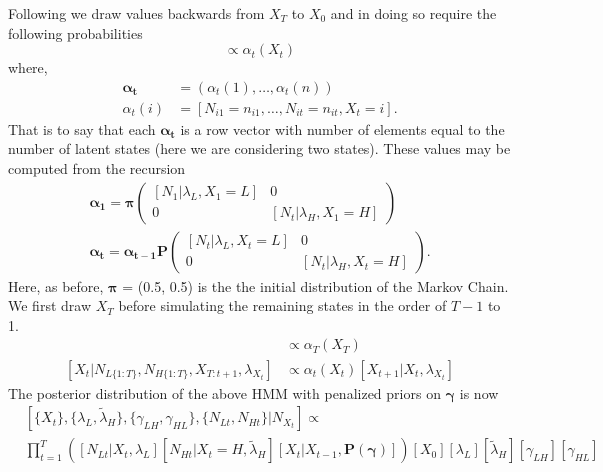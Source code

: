\documentclass[cmbright,fleqn,referee]{envauth}
\begin{document}
Following \cite{Zucchini2009a} we draw values backwards from $X_T$ to $X_0$ and in doing so require the following probabilities
\begin{equation}
[X_t | N_{L\{1:t\}}, N_{H\{1:t\}}, \lambda_{X_t}] \propto \alpha_t(X_t)
\label{e:startFB}
\end{equation}
where, 
\begin{align}
\bm{\alpha_t} &= (\alpha_t(1), \dots, \alpha_t(n))\\
\alpha_t(i) &= [N_{i1} = n_{i1}, \dots, N_{it} = n_{it}, X_t = i].
\end{align}
That is to say that each $\bm{\alpha_t}$ is a row vector with number of elements equal to the number of latent states (here we are considering two states).  These values may be computed from the recursion
\begin{align}
\bm{\alpha_1} = \bm{\pi} \begin{pmatrix}
[N_1|\lambda_{L}, X_1 = L] & 0\\
0 & [N_t | \lambda_{H}, X_1 = H]
\end{pmatrix}  \\
\bm{\alpha_t = \alpha_{t - 1}}\mathbf{P}\begin{pmatrix}
[N_t|\lambda_{L}, X_t = L] & 0\\
0 & [N_t | \lambda_{H}, X_t = H]
\end{pmatrix} .
\end{align}
Here, as before, $\bm{\pi}$ = (0.5, 0.5) is the the initial distribution of the Markov Chain. We first draw $X_T$ before simulating the remaining states in the order of $T - 1$ to 1. 
\begin{align}
[X_T | N_{L\{1:T\}}, N_{H\{1:T\}}, \lambda_{X_T}] &\propto \alpha_T(X_T)\\
[X_t | N_{L\{1:T\}}, N_{H\{1:T\}}, X_{T:t+1}, \lambda_{X_t}] &\propto \alpha_t(X_t) [X_{t+1} | X_t, \lambda_{X_t}]
\label{e:endFB}
\end{align}
The posterior distribution of the above HMM with penalized priors on $\bm{\gamma}$ is now
\begin{equation}
\begin{aligned}
 &[\{X_t\}, \{\lambda_L, \tilde{\lambda}_H\}, \{\gamma_{LH}, \gamma_{HL}\}, \{N_{Lt}, N_{Ht}\} | N_{X_t} ] \propto \\
 &\prod_{t = 1}^T \left( [N_{Lt} | X_t, \lambda_L] [N_{Ht} | X_t = H,  \tilde{\lambda}_H] [X_t | X_{t-1}, \mathbf{P}(\bm{\gamma})] \right) [X_0] [\lambda_L] [\tilde{\lambda}_H] [\gamma_{LH}][\gamma_{HL}]
\end{aligned}
\end{equation}
\end{document}
